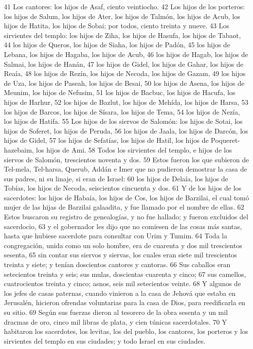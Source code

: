 41 Los cantores: los hijos de Asaf, ciento veintiocho.
42 Los hijos de los porteros: los hijos de Salum, los hijos de Ater, los hijos de Talmón, los hijos de Acub, los hijos de Hatita, los hijos de Sobai; por todos, ciento treinta y nueve.
43 Los sirvientes del templo: los hijos de Ziha, los hijos de Hasufa, los hijos de Tabaot,
44 los hijos de Queros, los hijos de Siaha, los hijos de Padón,
45 los hijos de Lebana, los hijos de Hagaba, los hijos de Acub,
46 los hijos de Hagab, los hijos de Salmai, los hijos de Hanán,
47 los hijos de Gidel, los hijos de Gahar, los hijos de Reaía,
48 los hijos de Rezín, los hijos de Necoda, los hijos de Gazam,
49 los hijos de Uza, los hijos de Paseah, los hijos de Besai,
50 los hijos de Asena, los hijos de Meunim, los hijos de Nefusim,
51 los hijos de Bacbuc, los hijos de Hacufa, los hijos de Harhur,
52 los hijos de Bazlut, los hijos de Mehída, los hijos de Harsa,
53 los hijos de Barcos, los hijos de Sísara, los hijos de Tema,
54 los hijos de Nezía, los hijos de Hatifa.
55 Los hijos de los siervos de Salomón: los hijos de Sotai, los hijos de Soferet, los hijos de Peruda,
56 los hijos de Jaala, los hijos de Darcón, los hijos de Gidel,
57 los hijos de Sefatías, los hijos de Hatil, los hijos de Poqueret-hazebaim, los hijos de Ami.
58 Todos los sirvientes del templo, e hijos de los siervos de Salomón, trescientos noventa y dos.
59 Estos fueron los que subieron de Tel-mela, Tel-harsa, Querub, Addán e Imer que no pudieron demostrar la casa de sus padres, ni su linaje, si eran de Israel:
60 los hijos de Delaía, los hijos de Tobías, los hijos de Necoda, seiscientos cincuenta y dos.
61 Y de los hijos de los sacerdotes: los hijos de Habaía, los hijos de Cos, los hijos de Barzilai, el cual tomó mujer de las hijas de Barzilai galaadita, y fue llamado por el nombre de ellas.
62 Estos buscaron su registro de genealogías, y no fue hallado; y fueron excluidos del sacerdocio,
63 y el gobernador les dijo que no comiesen de las cosas más santas, hasta que hubiese sacerdote para consultar con Urim y Tumim. 
64 Toda la congregación, unida como un solo hombre, era de cuarenta y dos mil trescientos sesenta,
65 sin contar sus siervos y siervas, los cuales eran siete mil trescientos treinta y siete; y tenían doscientos cantores y cantoras.
66 Sus caballos eran setecientos treinta y seis; sus mulas, doscientas cuarenta y cinco;
67 sus camellos, cuatrocientos treinta y cinco; asnos, seis mil setecientos veinte.
68 Y algunos de los jefes de casas paternas, cuando vinieron a la casa de Jehová que estaba en Jerusalén, hicieron ofrendas voluntarias para la casa de Dios, para reedificarla en su sitio.
69 Según sus fuerzas dieron al tesorero de la obra sesenta y un mil dracmas de oro, cinco mil libras de plata, y cien túnicas sacerdotales.
70 Y habitaron los sacerdotes, los levitas, los del pueblo, los cantores, los porteros y los sirvientes del templo en sus ciudades; y todo Israel en sus ciudades. 

